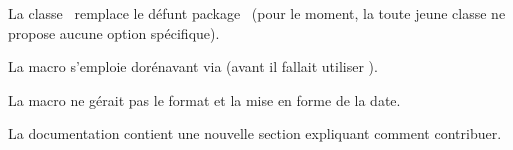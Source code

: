 \begin{tdocbreak}
	\item La classe \thisproj\ remplace le défunt package \thisproj\ (pour le moment, la toute jeune classe ne propose aucune option spécifique).

	\item La macro  s'emploie dorénavant via  (avant il fallait utiliser ).
\end{tdocbreak}


\begin{tdocfix}
	\item La macro  ne gérait pas le format et la mise en forme de la date.
\end{tdocfix}


\begin{tdocnew}
	\item La documentation contient une nouvelle section expliquant comment contribuer.
\end{tdocnew}

